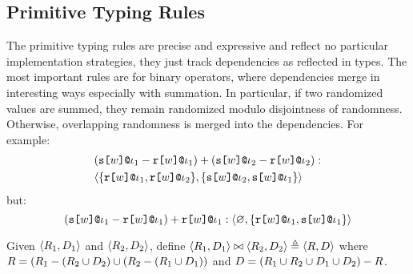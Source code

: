 \subsection{Primitive Typing Rules}

The primitive typing rules are precise and expressive and reflect no particular
implementation strategies, they just track dependencies as reflected in types.
The most important rules are for binary operators, where dependencies merge
in interesting ways especially with summation. In particular, if two
randomized values are summed, they remain randomized modulo disjointness
of randomness. Otherwise, overlapping randomness is merged into the dependencies.
For example:
\begin{eqnarray*}
& (\texttt{s[}w\texttt{]}\texttt{@}\iota_1 - \texttt{r[}w\texttt{]}\texttt{@}\iota_1) + (\texttt{s[}w\texttt{]}\texttt{@}\iota_2 - \texttt{r[}w\texttt{]}\texttt{@}\iota_2) : \\
& \langle \{ \texttt{r[}w\texttt{]}\texttt{@}\iota_1,\texttt{r[}w\texttt{]}\texttt{@}\iota_2 \}, \{ \texttt{s[}w\texttt{]}\texttt{@}\iota_2,\texttt{s[}w\texttt{]}\texttt{@}\iota_1 \} \rangle
\end{eqnarray*}
but:
$$
(\texttt{s[}w\texttt{]}\texttt{@}\iota_1 - \texttt{r[}w\texttt{]}\texttt{@}\iota_1) + \texttt{r[}w\texttt{]}\texttt{@}\iota_1 :
\langle \varnothing, \{ \texttt{r[}w\texttt{]}\texttt{@}\iota_1,\texttt{s[}w\texttt{]}\texttt{@}\iota_1 \} \rangle
$$


\begin{definition}
  Given $\langle R_1, D_1 \rangle$ and $\langle R_2, D_2 \rangle$, define
  $\langle R_1, D_1 \rangle \bowtie \langle R_2, D_2 \rangle \triangleq \langle R, D \rangle$ where
  $R = (R_1 - (R_2 \cup D_2) \cup (R_2 - (R_1 \cup D_1))$ 
  and $D = (R_1 \cup R_2 \cup D_1 \cup D_2) - R $.
\end{definition}

